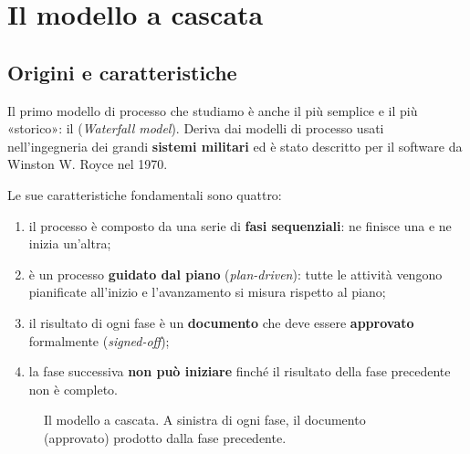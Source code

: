 \chapter{Il modello a cascata}

\section{Origini e caratteristiche}

Il primo modello di processo che studiamo è anche il più semplice e il più «storico»: il 
(\textit{Waterfall model}). Deriva dai modelli di processo usati nell'ingegneria dei grandi \textbf{sistemi militari}
ed è stato descritto per il software da Winston W. Royce nel 1970.

Le sue caratteristiche fondamentali sono quattro:

\begin{enumerate}
  \item il processo è composto da una serie di \textbf{fasi sequenziali}: ne finisce una e ne inizia un'altra;
  \item è un processo \textbf{guidato dal piano} (\textit{plan-driven}): tutte le attività vengono pianificate all'inizio e
        l'avanzamento si misura rispetto al piano;
  \item il risultato di ogni fase è un \textbf{documento} che deve essere \textbf{approvato} formalmente (\textit{signed-off});
  \item la fase successiva \textbf{non può iniziare} finché il risultato della fase precedente non è completo.
\end{enumerate}

\begin{figure}[H]
\centering
{}
\caption{Il modello a cascata. A sinistra di ogni fase, il documento (approvato) prodotto dalla fase precedente.}
\end{figure}


